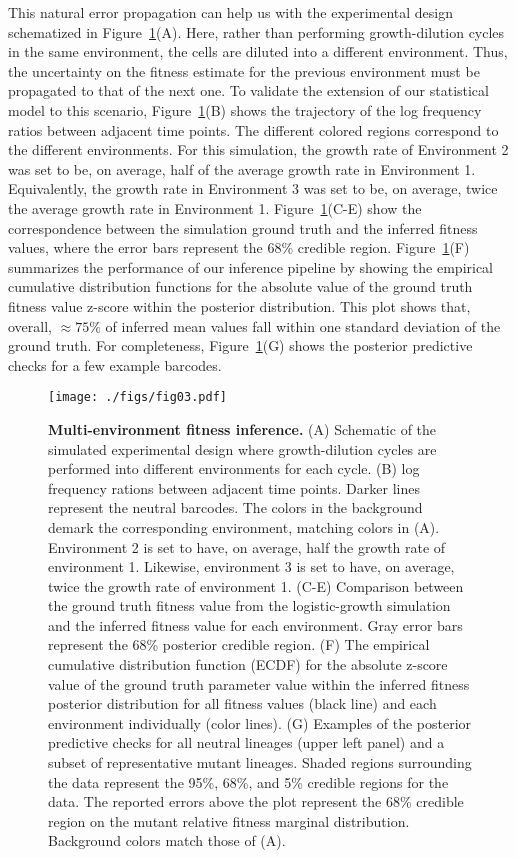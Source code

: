 \documentclass[
  letterpaper,
  DIV=11,
  numbers=noendperiod]{scrartcl}
\begin{document}
\begin{refsegment}
This natural error propagation can help us with the experimental design
schematized in Figure~\ref{fig-03}(A). Here, rather than performing
growth-dilution cycles in the same environment, the cells are diluted
into a different environment. Thus, the uncertainty on the fitness
estimate for the previous environment must be propagated to that of the
next one. To validate the extension of our statistical model to this
scenario, Figure~\ref{fig-03}(B) shows the trajectory of the log
frequency ratios between adjacent time points. The different colored
regions correspond to the different environments. For this simulation,
the growth rate of Environment 2 was set to be, on average, half of the
average growth rate in Environment 1. Equivalently, the growth rate in
Environment 3 was set to be, on average, twice the average growth rate
in Environment 1. Figure~\ref{fig-03}(C-E) show the correspondence
between the simulation ground truth and the inferred fitness values,
where the error bars represent the 68\% credible region.
Figure~\ref{fig-03}(F) summarizes the performance of our inference
pipeline by showing the empirical cumulative distribution functions for
the absolute value of the ground truth fitness value z-score within the
posterior distribution. This plot shows that, overall, \(\approx 75\%\)
of inferred mean values fall within one standard deviation of the ground
truth. For completeness, Figure~\ref{fig-03}(G) shows the posterior
predictive checks for a few example barcodes.

\begin{figure}

{\centering \texttt{[image: ./figs/fig03.pdf]}

}

\caption{\label{fig-03}\textbf{Multi-environment fitness inference.} (A)
Schematic of the simulated experimental design where growth-dilution
cycles are performed into different environments for each cycle. (B) log
frequency rations between adjacent time points. Darker lines represent
the neutral barcodes. The colors in the background demark the
corresponding environment, matching colors in (A). Environment 2 is set
to have, on average, half the growth rate of environment 1. Likewise,
environment 3 is set to have, on average, twice the growth rate of
environment 1. (C-E) Comparison between the ground truth fitness value
from the logistic-growth simulation and the inferred fitness value for
each environment. Gray error bars represent the 68\% posterior credible
region. (F) The empirical cumulative distribution function (ECDF) for
the absolute z-score value of the ground truth parameter value within
the inferred fitness posterior distribution for all fitness values
(black line) and each environment individually (color lines). (G)
Examples of the posterior predictive checks for all neutral lineages
(upper left panel) and a subset of representative mutant lineages.
Shaded regions surrounding the data represent the 95\%, 68\%, and 5\%
credible regions for the data. The reported errors above the plot
represent the 68\% credible region on the mutant relative fitness
marginal distribution. Background colors match those of (A).}


\end{figure}
\end{refsegment}
\end{document}
